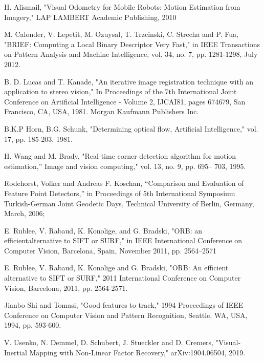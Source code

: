\documentclass[11pt]{easychair}
\begin{document}
\begin{thebibliography}{00}
	
	 H. Alismail, "Visual Odometry for Mobile Robots: Motion Estimation from Imagery," LAP LAMBERT Academic Publishing, 2010 
 	
	M. Calonder, V. Lepetit, M. Ozuysal, T. Trzcinski, C. Strecha and P. Fua, "BRIEF: Computing a Local Binary Descriptor Very Fast," in IEEE Transactions on Pattern Analysis and Machine Intelligence, vol. 34, no. 7, pp. 1281-1298, July 2012.
	
	 B. D. Lucas and T. Kanade, "An iterative image registration technique
	with an application to stereo vision," In Proceedings of the 7th International
	Joint Conference on Artificial Intelligence - Volume 2, IJCAI81,
	pages 674679, San Francisco, CA, USA, 1981. Morgan Kaufmann
	Publishers Inc.
	
	 B.K.P Horn, B.G. Schunk, "Determining optical flow, Artificial Intelligence,"
	vol. 17, pp. 185-203, 1981.
	
	
	 H. Wang and M. Brady, "Real-time corner detection algorithm for
	motion estimation,” Image and vision computing," vol. 13, no. 9, pp. 695–
	703, 1995.
	
	 Rodehorst, Volker and Andreas F. Koschan, “Comparison and Evaluation of Feature Point Detectors,” in Proceedings
	of 5th International Symposium Turkish-German Joint Geodetic Days, Technical University of
	Berlin, Germany, March, 2006; 
		
	 E. Rublee, V. Rabaud, K. Konolige, and G. Bradski, "ORB: an efficientalternative  to  SIFT  or  SURF,"  in IEEE  International  Conference  on Computer Vision, Barcelona, Spain, November 2011, pp. 2564–2571
	
	 E. Rublee, V. Rabaud, K. Konolige and G. Bradski, "ORB: An efficient alternative to SIFT or SURF," 2011 International Conference on Computer Vision, Barcelona, 2011, pp. 2564-2571.
	
	 Jianbo Shi and Tomasi, "Good features to track," 1994 Proceedings of IEEE Conference on Computer Vision and Pattern Recognition, Seattle, WA, USA, 1994, pp. 593-600.

	 V. Usenko, N. Demmel, D. Schubert, J. Stueckler and D. Cremers, "Visual-Inertial Mapping with Non-Linear Factor Recovery," arXiv:1904.06504, 2019.

	
	
	
\end{thebibliography}
\end{document}

